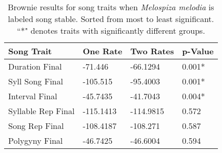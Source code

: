 \documentclass[a4paper,12pt]{article}
\begin{document}
\begin{table}[ht]
\caption{Brownie results for song traits when \textit{Melospiza melodia} is labeled song stable.  Sorted from most to least significant.  ``*" denotes traits with significantly different groups.}
\centering
\begin{tabular}{llll}
  \hline
Song Trait & One Rate & Two Rates & p-Value \\ 
  \hline
Duration Final & -71.446 & -66.1294 & 0.001* \\ 
  Syll Song Final & -105.515 & -95.4003 & 0.001* \\ 
  Interval Final & -45.7435 & -41.7043 & 0.004* \\ 
  Syllable Rep Final & -115.1413 & -114.9815 & 0.572 \\ 
  Song Rep Final & -108.4187 & -108.271 & 0.587 \\ 
  Polygyny Final & -46.7425 & -46.6004 & 0.594 \\ 
   \hline
   \end{tabular}
\end{table}
\end{document}
